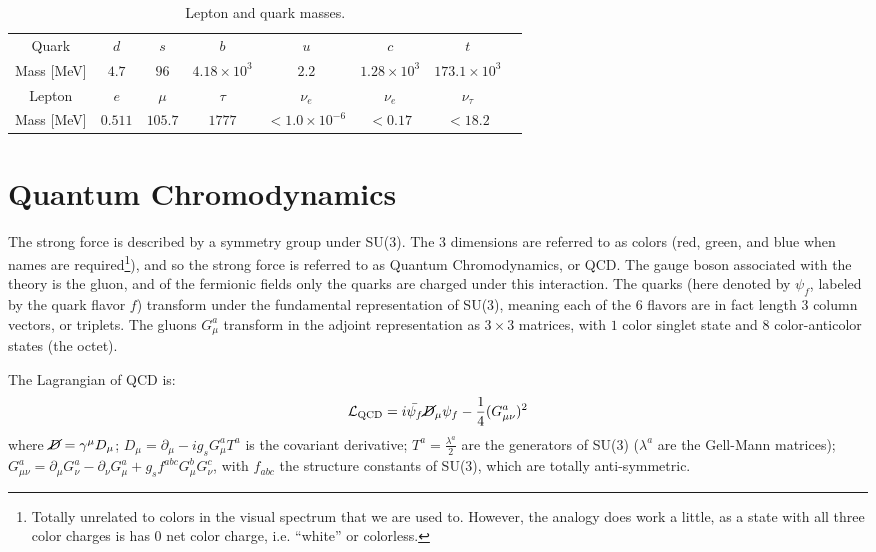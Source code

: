 \begin{table}[]
\centering
\caption{Lepton and quark masses.}
\label{tab:SM:masses}
\begin{tabular}{c c c c c c c c}
\hline
Quark & $d$ & $s$ & $b$ & $u$ & $c$ & $t$ & \\
Mass [MeV] & $4.7$ & $96$ & $4.18\times10^3$ & $2.2$ & $1.28\times10^3$ & $173.1\times10^3$\\
\hline
Lepton & $e$ & $\mu$ & $\tau$ & $\nu_e$ & $\nu_e$ & $\nu_\tau$ & \\
Mass [MeV] & $0.511$ & $105.7$ & $1777$ & $<1.0\times10^{-6}$ & $<0.17$ & $<18.2$
\end{tabular}
\end{table}

\section{Quantum Chromodynamics}
\label{sec:SM:QCD}
The strong force is described by a symmetry group under SU(3).
The $3$ dimensions are referred to as colors (red, green, and blue when names are required\footnote{Totally unrelated to colors in the visual spectrum that we are used to. However, the analogy does work a little, as a state with all three color charges is has $0$ net color charge, i.e. ``white'' or colorless.}), and so the strong force is referred to as Quantum Chromodynamics, or QCD.
The gauge boson associated with the theory is the gluon, and of the fermionic fields only the quarks are charged under this interaction.
The quarks (here denoted by $\psi_f$, labeled by the quark flavor $f$) transform under the fundamental representation of SU(3), meaning each of the $6$ flavors are in fact length $3$ column vectors, or triplets.
The gluons $G_\mu^a$ transform in the adjoint representation as $3\times 3$ matrices, with $1$ color singlet state and $8$ color-anticolor states (the octet).

The Lagrangian of QCD is:
\begin{align}
  \mathcal{L}_\text{QCD} = i\bar{\psi_f}\cancel{D}_\mu\psi_f-\frac{1}{4}(G_{\mu\nu}^a)^2
\end{align}
where $\cancel{D}=\gamma^\mu D_\mu$; $D_\mu = \partial_\mu - ig_sG_\mu^aT^a$ is the covariant derivative; $T^a=\frac{\lambda^a}{2}$ are the generators of SU(3) ($\lambda^a$ are the Gell-Mann matrices); $G_{\mu\nu}^a = \partial_\mu G_\nu^a-\partial_\nu G_\mu^a + g_s f^{abc} G_\mu^b G_\nu^c$, with $f_{abc}$ the structure constants of SU(3), which are totally anti-symmetric.

